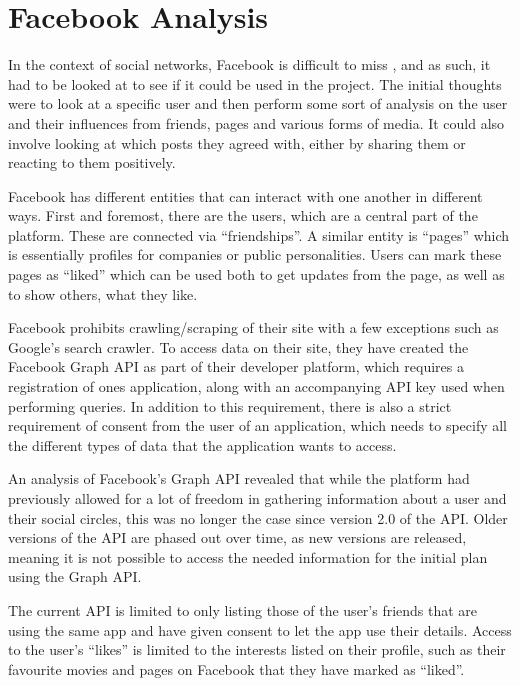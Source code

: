 \chapter{Facebook Analysis}\label{chap:facebook-analysis}
In the context of social networks, Facebook is difficult to miss
\citep{FacebookPopularity}, and as such, it had to be looked at to see if it
could be used in the project.
The initial thoughts were to look at a specific user and then perform some sort of analysis on the user and their
influences from friends, pages and various forms of media.
It could also involve looking at which posts they agreed with, either by sharing
them or reacting to them positively.\nl

Facebook has different entities that can interact with one another in different ways.
First and foremost, there are the users, which are a central part of the
platform. These are connected via ``friendships''.
A similar entity is ``pages'' which is essentially profiles for companies or
public personalities.
Users can mark these pages as ``liked'' which can be used both to get updates
from the page, as well as to show others, what they like.\nl

Facebook prohibits crawling/scraping of their site with a few exceptions such as Google's search crawler.
To access data on their site, they have created the Facebook Graph API as part
of their developer platform, which requires a registration of ones application, along with an accompanying API key used when performing queries.
In addition to this requirement, there is also a strict requirement of consent
from the user of an application, which needs to specify all the different types of data that the application wants to access.\nl

An analysis of Facebook's Graph API revealed that while the platform had previously allowed for a lot of freedom in
gathering information about a user and their social circles, this was no longer the case since version 2.0 of the API.
Older versions of the API are phased out over time, as new versions are released, meaning it is not possible to access
the needed information for the initial plan using the Graph
API.\nl

The current API is limited to only listing those of the user's friends that are using the same app and have given
consent to let the app use their details.
Access to the user's ``likes'' is limited to the interests listed on their profile, such as their favourite movies and
pages on Facebook that they have marked as ``liked''.\nl

